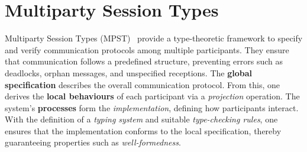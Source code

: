 



\section{Multiparty Session Types}
Multiparty Session Types (MPST)~\cite{honda2008multiparty} 
provide a type-theoretic framework to specify and verify communication 
protocols among multiple participants. They ensure that communication 
follows a predefined structure, preventing errors such as deadlocks, 
orphan messages, and unspecified receptions. The 
\textbf{global specification} describes the overall communication 
protocol. From this, one derives the \textbf{local behaviours} of each 
participant via a \emph{projection} operation. The system's 
\textbf{processes} form the \emph{implementation}, defining how 
participants interact. With the definition of a \emph{typing system} 
and suitable \emph{type-checking rules}, one ensures that the 
implementation conforms to the local specification, thereby 
guaranteeing properties such as \emph{well-formedness}.  


